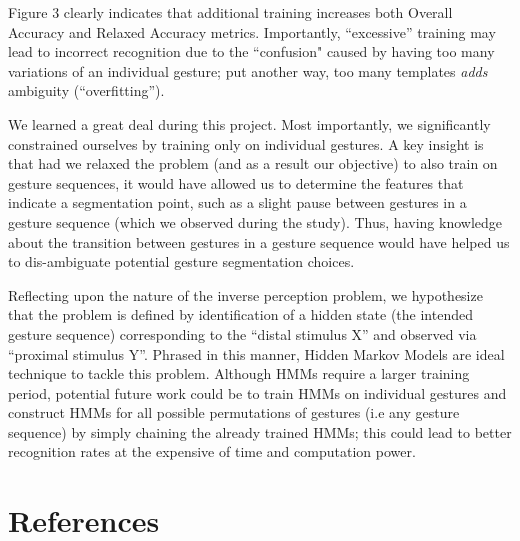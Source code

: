 \documentclass[twoside]{article}
\begin{document}
\begin{multicols}{2}
Figure 3 clearly indicates that additional training increases both Overall
Accuracy and Relaxed Accuracy metrics. Importantly, ``excessive'' training may
lead to incorrect recognition due to the ``confusion" caused by having too many
variations of an individual gesture; put another way, too many templates
\emph{adds} ambiguity (``overfitting'').


We learned a great deal during this project. Most importantly, we significantly constrained
ourselves by training only on individual gestures. A key insight is that had we relaxed 
the problem (and as a result our objective) to also train on gesture sequences, 
it would have allowed us to determine the features 
that indicate a segmentation point, such as a slight pause between 
gestures in a gesture sequence (which we observed during the study). Thus,
having knowledge about the transition between gestures in a gesture sequence would have
helped us to dis-ambiguate potential gesture segmentation choices.

Reflecting upon the nature of the inverse perception problem, we hypothesize
that the problem is defined by identification of a hidden state (the intended
gesture sequence) corresponding to the ``distal stimulus X'' and observed via
``proximal stimulus Y''. Phrased in this manner,  Hidden Markov Models are ideal technique
to tackle this problem. Although HMMs require a larger training period, potential future work
could be to train HMMs on individual gestures and construct HMMs for all possible permutations
of gestures (i.e any gesture sequence) by simply chaining the already trained HMMs; this could lead to
better recognition rates at the expensive of time and computation power.
\section{References}

\begin{spacing}{0.9}
	
%
\begingroup
\renewcommand{\section}[2]{}%

\endgroup
\end{spacing}

\end{multicols}
\end{document}
